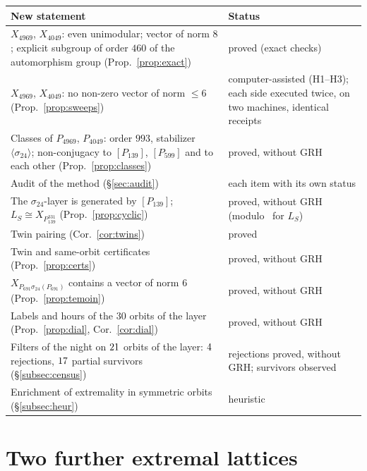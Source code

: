 \documentclass[11pt,a4paper]{amsart}
\theoremstyle{plain}
\theoremstyle{definition}
\newcommand{\LS}{L_{S}}
\begin{document}
\begin{center}\small\renewcommand{\arraystretch}{1.2}
\begin{tabular}{>{\raggedright\arraybackslash}p{8.4cm}>{\raggedright\arraybackslash}p{6.2cm}}
\toprule
New statement & Status \\
\midrule
$X_{4969}$, $X_{4049}$: even unimodular; vector of norm $8$; explicit subgroup of order $460$ of the automorphism group (Prop.~\ref{prop:exact}) & proved (exact checks) \\
$X_{4969}$, $X_{4049}$: no non-zero vector of norm $\le6$ (Prop.~\ref{prop:sweeps}) & computer-assisted (H1--H3); each side executed twice, on two machines, identical receipts \\
Classes of $P_{4969}$, $P_{4049}$: order $993$, stabilizer $\langle\sigma_{24}\rangle$; non-conjugacy to $[P_{139}]$, $[P_{599}]$ and to each other (Prop.~\ref{prop:classes}) & proved, without GRH \\
Audit of the method (\S\ref{sec:audit}) & each item with its own status \\
The $\sigma_{24}$-layer is generated by $[P_{139}]$; $\LS\cong X_{P_{139}^{331}}$ (Prop.~\ref{prop:cyclic}) & proved, without GRH (modulo~\cite{Sak26} for $\LS$) \\
Twin pairing (Cor.~\ref{cor:twins}) & proved \\
Twin and same-orbit certificates (Prop.~\ref{prop:certs}) & proved, without GRH \\
$X_{P_{691}\sigma_{24}(P_{691})}$ contains a vector of norm $6$ (Prop.~\ref{prop:temoin}) & proved, without GRH \\
Labels and hours of the $30$ orbits of the layer (Prop.~\ref{prop:dial}, Cor.~\ref{cor:dial}) & proved, without GRH \\
Filters of the night on $21$ orbits of the layer: $4$ rejections, $17$ partial survivors (\S\ref{subsec:census}) & rejections proved, without GRH; survivors observed \\
Enrichment of extremality in symmetric orbits (\S\ref{subsec:heur}) & heuristic \\
\bottomrule
\end{tabular}
\end{center}

\section{Two further extremal lattices}\label{sec:new}
\end{document}
